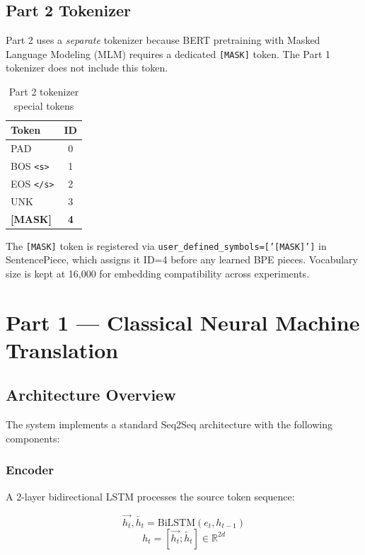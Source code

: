 \documentclass[12pt,a4paper]{article}
\begin{document}
\subsection{Part 2 Tokenizer}

Part 2 uses a \emph{separate} tokenizer because BERT pretraining with Masked Language Modeling (MLM) requires a dedicated \texttt{[MASK]} token. The Part 1 tokenizer does not include this token.

\begin{table}[H]
\centering
\caption{Part 2 tokenizer special tokens}
\begin{tabular}{lc}
\toprule
\textbf{Token} & \textbf{ID} \\
\midrule
PAD & 0 \\
BOS \texttt{<s>} & 1 \\
EOS \texttt{</s>} & 2 \\
UNK & 3 \\
\textbf{[MASK]} & \textbf{4} \\
\bottomrule
\end{tabular}
\end{table}

The \texttt{[MASK]} token is registered via \texttt{user\_defined\_symbols=['[MASK]']} in SentencePiece, which assigns it ID=4 before any learned BPE pieces. Vocabulary size is kept at 16,000 for embedding compatibility across experiments.

\section{Part 1 — Classical Neural Machine Translation}

\subsection{Architecture Overview}

The system implements a standard Seq2Seq architecture with the following components:

\subsubsection{Encoder}

A 2-layer bidirectional LSTM processes the source token sequence:

\[
\overrightarrow{h_t}, \overleftarrow{h_t} = \text{BiLSTM}(e_t, h_{t-1})
\]
\[
h_t = [\overrightarrow{h_t};\overleftarrow{h_t}] \in \mathbb{R}^{2d}
\]
\end{document}
